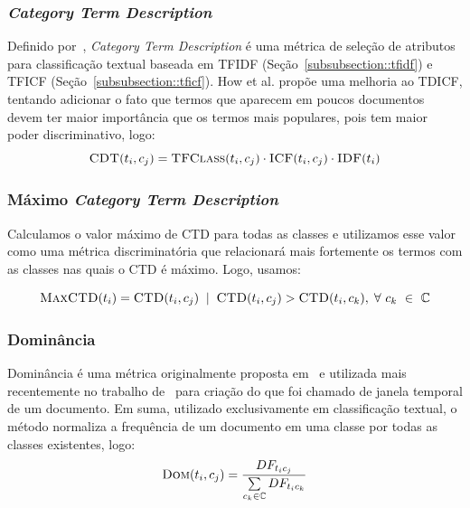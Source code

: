 \subsubsection{\textit{Category Term Description}}
\label{subsubsection::ctd}

Definido por~\cite{ChihHow04}, \textit{Category Term Description} é uma métrica de seleção de atributos para classificação textual baseada em \textsc{TFIDF} (Seção~\ref{subsubsection::tfidf}) e \textsc{TFICF} (Seção~\ref{subsubsection::tficf}). How et al. propõe uma melhoria ao TDICF, tentando adicionar o fato que termos que aparecem em poucos documentos devem ter maior importância que os termos mais populares, pois tem maior poder discriminativo, logo:
\begin{equation}\label{eqn::cdt}
 \textsc{CDT}(t_i, c_j) = \textsc{TFClass}(t_i, c_j) \cdot \textsc{ICF}(t_i, c_j) \cdot \textsc{IDF}(t_i)
\end{equation}

\subsubsection{Máximo \textit{Category Term Description}}
\label{subsubsection::maxctd}
Calculamos o valor máximo de \textsc{CTD} para todas as classes e utilizamos esse valor como uma métrica discriminatória que relacionará mais fortemente os termos com as classes nas quais o \textsc{CTD} é máximo. Logo, usamos:

\begin{equation}\label{eqn::maxdom}
 \textsc{MaxCTD}(t_i) = \textsc{CTD}(t_i,c_j) \; \; | \;\; \textsc{CTD}(t_i, c_j) > \textsc{CTD}(t_i, c_k), \; \forall\ c_k\ \in\ \mathbb{C}
\end{equation}

\subsubsection{Dominância}
\label{subsubsection::dom}

Dominância é uma métrica originalmente proposta em~\cite{Zaiane02} e utilizada mais recentemente no trabalho de~\cite{Rocha08} para criação do que foi chamado de janela temporal de um documento. Em suma, utilizado exclusivamente em classificação textual, o método normaliza a frequência de um documento em uma classe por todas as classes existentes, logo:
\begin{equation}\label{eqn::dom}
 \textsc{Dom}(t_i, c_j) = \frac{ DF_{t_ic_j} } { \sum\limits_{c_k \in \mathbb{C}} DF_{t_ic_k} } 
\end{equation}

